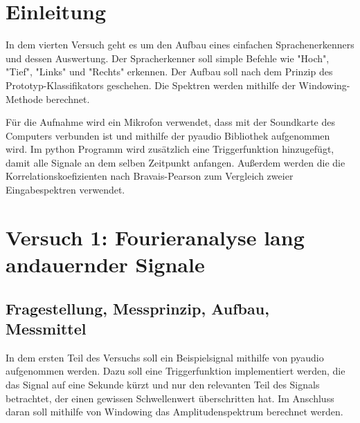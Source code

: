 \documentclass[12pt, oneside, a4paper, \docLanguage]{report}
\begin{document}

\setcounter{section}{0}



\clearpage

%
%


%
%


%
%


%
%




\setcounter{page}{1}
\pagestyle{default}
%
%
\chapter{Einleitung}
\label{chap:EINL}
In dem vierten Versuch geht es um den Aufbau eines einfachen Sprachenerkenners und dessen Auswertung. Der Spracherkenner soll simple Befehle wie "Hoch", "Tief", "Links" und "Rechts" erkennen. Der Aufbau soll nach dem Prinzip des Prototyp-Klassifikators geschehen.
Die Spektren werden mithilfe der Windowing-Methode berechnet.

Für die Aufnahme wird ein Mikrofon verwendet, dass mit der Soundkarte des Computers verbunden ist und mithilfe der pyaudio Bibliothek aufgenommen wird. Im python Programm wird zusätzlich eine Triggerfunktion hinzugefügt, damit alle Signale an dem selben Zeitpunkt anfangen.
Außerdem werden die die Korrelationskoefizienten nach Bravais-Pearson zum Vergleich zweier Eingabespektren verwendet.

%
%
\chapter{Versuch 1: Fourieranalyse lang andauernder Signale}
\label{chap:VERSUCH_1}

\section{Fragestellung, Messprinzip, Aufbau, Messmittel}
\label{chap:VERSUCH_1_FRAGESTELLUNG}
In dem ersten Teil des Versuchs soll ein Beispielsignal mithilfe von pyaudio aufgenommen werden. Dazu soll eine Triggerfunktion implementiert werden, die das Signal auf eine Sekunde kürzt und nur den relevanten Teil des Signals betrachtet, der einen gewissen Schwellenwert überschritten hat. Im Anschluss daran soll mithilfe von Windowing das Amplitudenspektrum berechnet werden.
\end{document}
